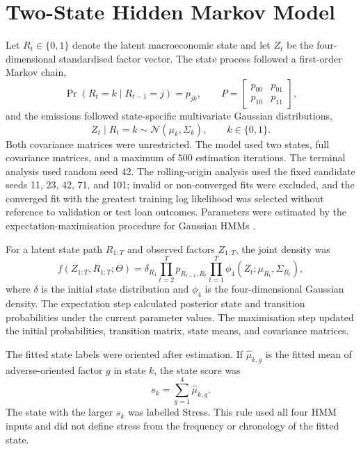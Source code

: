 \section{Two-State Hidden Markov Model}

Let $R_t\in\{0,1\}$ denote the latent macroeconomic state and let $Z_t$ be the four-dimensional standardised factor vector. The state process followed a first-order Markov chain,
\begin{equation}
\Pr(R_t=k\mid R_{t-1}=j)=p_{jk},
\qquad
P=
\begin{bmatrix}
p_{00}&p_{01}\\
p_{10}&p_{11}
\end{bmatrix},
\label{eq:hmm-transition}
\end{equation}
and the emissions followed state-specific multivariate Gaussian distributions,
\begin{equation}
Z_t\mid R_t=k\sim\mathcal{N}(\mu_k,\Sigma_k),
\qquad k\in\{0,1\}.
\label{eq:gaussian-emission}
\end{equation}
Both covariance matrices were unrestricted. The model used two states, full covariance matrices, and a maximum of 500 estimation iterations. The terminal analysis used random seed 42. The rolling-origin analysis used the fixed candidate seeds 11, 23, 42, 71, and 101; invalid or non-converged fits were excluded, and the converged fit with the greatest training log likelihood was selected without reference to validation or test loan outcomes. Parameters were estimated by the expectation-maximisation procedure for Gaussian HMMs \citep{baum1970maximization,bilmes1998em}.

For a latent state path $R_{1:T}$ and observed factors $Z_{1:T}$, the joint density was
\begin{equation}
f(Z_{1:T},R_{1:T};\Theta)
=
\delta_{R_1}
\prod_{t=2}^{T}p_{R_{t-1},R_t}
\prod_{t=1}^{T}\phi_4(Z_t;\mu_{R_t},\Sigma_{R_t}),
\label{eq:hmm-joint-density}
\end{equation}
where $\delta$ is the initial state distribution and $\phi_4$ is the four-dimensional Gaussian density. The expectation step calculated posterior state and transition probabilities under the current parameter values. The maximisation step updated the initial probabilities, transition matrix, state means, and covariance matrices.

The fitted state labels were oriented after estimation. If $\widehat\mu_{k,g}$ is the fitted mean of adverse-oriented factor $g$ in state $k$, the state score was
\begin{equation}
s_k=\sum_{g=1}^{4}\widehat\mu_{k,g}.
\label{eq:state-stress-score}
\end{equation}
The state with the larger $s_k$ was labelled Stress. This rule used all four HMM inputs and did not define stress from the frequency or chronology of the fitted state.

